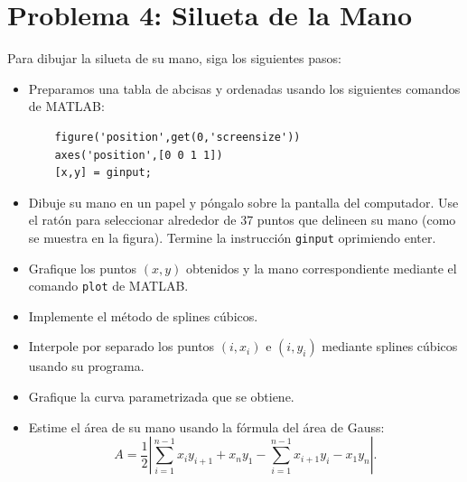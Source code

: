 
\section{Problema 4: Silueta de la Mano}
Para dibujar la silueta de su mano, siga los siguientes pasos:

\begin{itemize}
    \item Preparamos una tabla de abcisas y ordenadas usando los siguientes comandos de MATLAB:
    \begin{lstlisting}
    figure('position',get(0,'screensize'))
    axes('position',[0 0 1 1])
    [x,y] = ginput;
    \end{lstlisting}
    \item Dibuje su mano en un papel y póngalo sobre la pantalla del computador. Use el ratón para seleccionar alrededor de 37 puntos que delineen su mano (como se muestra en la figura). Termine la instrucción \texttt{ginput} oprimiendo enter.
    \item Grafique los puntos $(x, y)$ obtenidos y la mano correspondiente mediante el comando \texttt{plot} de MATLAB.
    \item Implemente el método de splines cúbicos.
    \item Interpole por separado los puntos $(i, x_i)$ e $(i, y_i)$ mediante splines cúbicos usando su programa.
    \item Grafique la curva parametrizada que se obtiene.
    \item Estime el área de su mano usando la fórmula del área de Gauss:
    \[
    A = \frac{1}{2} \left| \sum_{i=1}^{n-1} x_i y_{i+1} + x_n y_1 - \sum_{i=1}^{n-1} x_{i+1} y_i - x_1 y_n \right|.
    \]
\end{itemize}

